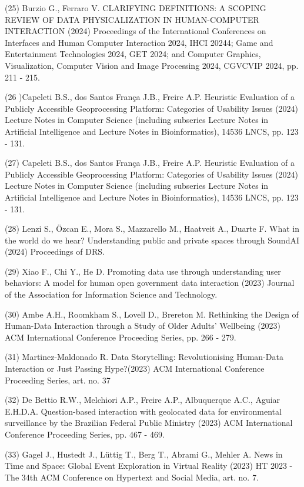 \documentclass[
	12pt,				%
	oneside,			%
	a4paper,			%
	english,			%
	brazil				%
	]{abntex2ppgsi}
\begin{document}
\begin{apendicesenv}
(25) Burzio G., Ferraro V. CLARIFYING DEFINITIONS: A SCOPING REVIEW OF DATA PHYSICALIZATION IN HUMAN-COMPUTER INTERACTION (2024) Proceedings of the International Conferences on Interfaces and Human Computer Interaction 2024, IHCI 20244; Game and Entertainment Technologies 2024, GET 2024; and Computer Graphics, Visualization, Computer Vision and Image Processing 2024, CGVCVIP 2024, pp. 211 - 215.

(26 )Capeleti B.S., dos Santos França J.B., Freire A.P. Heuristic Evaluation of a Publicly Accessible Geoprocessing Platform: Categories of Usability Issues (2024) Lecture Notes in Computer Science (including subseries Lecture Notes in Artificial Intelligence and Lecture Notes in Bioinformatics), 14536 LNCS, pp. 123 - 131.

(27) Capeleti B.S., dos Santos França J.B., Freire A.P. Heuristic Evaluation of a Publicly Accessible Geoprocessing Platform: Categories of Usability Issues (2024) Lecture Notes in Computer Science (including subseries Lecture Notes in Artificial Intelligence and Lecture Notes in Bioinformatics), 14536 LNCS, pp. 123 - 131.

(28) Lenzi S., Özcan E., Mora S., Mazzarello M., Haatveit A., Duarte F. What in the world do we hear? Understanding public and private spaces through SoundAI (2024) Proceedings of DRS.

(29) Xiao F., Chi Y., He D. Promoting data use through understanding user behaviors: A model for human open government data interaction (2023) Journal of the Association for Information Science and Technology.

(30) Ambe A.H., Roomkham S., Lovell D., Brereton M. Rethinking the Design of Human-Data Interaction through a Study of Older Adults' Wellbeing (2023) ACM International Conference Proceeding Series, pp. 266 - 279.


(31) Martinez-Maldonado R. Data Storytelling: Revolutionising Human-Data Interaction or Just Passing Hype?(2023) ACM International Conference Proceeding Series, art. no. 37

(32) De Bettio R.W., Melchiori A.P., Freire A.P., Albuquerque A.C., Aguiar E.H.D.A. Question-based interaction with geolocated data for environmental surveillance by the Brazilian Federal Public Ministry (2023) ACM International Conference Proceeding Series, pp. 467 - 469.

(33) Gagel J., Hustedt J., Lüttig T., Berg T., Abrami G., Mehler A. News in Time and Space: Global Event Exploration in Virtual Reality (2023) HT 2023 - The 34th ACM Conference on Hypertext and Social Media, art. no. 7.


\end{apendicesenv}
\end{document}
